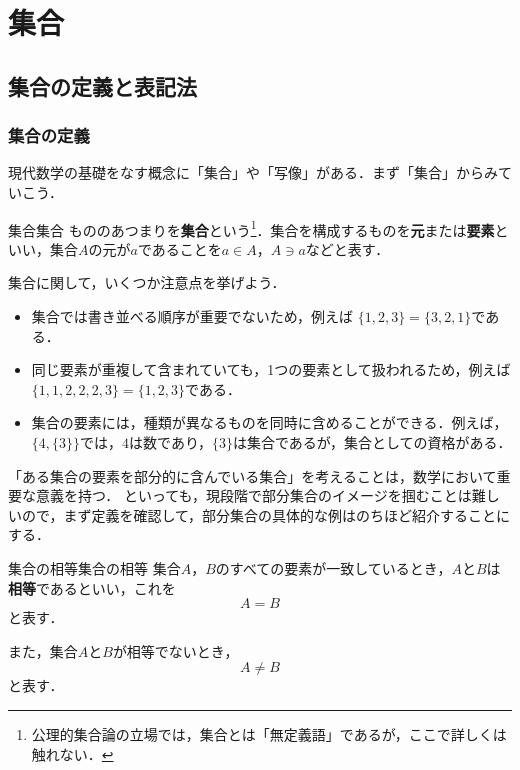 \documentclass[a4paper,11pt]{ltjsarticle}
\renewcommand{\emph}[1]{\textbf{#1}}
\begin{document}
\section{集合}
\subsection{集合の定義と表記法}

\subsubsection{集合の定義}

現代数学の基礎をなす概念に「集合」や「写像」がある．まず「集合」からみていこう．
\begin{definition}{集合}{集合}
  もののあつまりを\emph{集合}という\footnote{公理的集合論の立場では，集合とは「無定義語」であるが，ここで詳しくは触れない．}．集合を構成するものを\emph{元}または\emph{要素}といい，集合$A$の元が$a$であることを$a \in A$，$A \ni a$などと表す．
\end{definition}

集合に関して，いくつか注意点を挙げよう．

\begin{itemize}
  \item 集合では書き並べる順序が重要でないため，例えば $\{1, 2, 3\} = \{3, 2, 1\}$である．
  \item 同じ要素が重複して含まれていても，1つの要素として扱われるため，例えば$\{1, 1, 2, 2, 2, 3\} = \{1, 2, 3\}$である．
  \item 集合の要素には，種類が異なるものを同時に含めることができる．例えば，$\{4, \{3\}\}$では，$4$は数であり，$\{3\}$は集合であるが，集合としての資格がある．
\end{itemize}

「ある集合の要素を部分的に含んでいる集合」を考えることは，数学において重要な意義を持つ．
といっても，現段階で部分集合のイメージを掴むことは難しいので，まず定義を確認して，部分集合の具体的な例はのちほど紹介することにする．

\begin{definition}{集合の相等}{集合の相等}
  集合$A$，$B$のすべての要素が一致しているとき，$A$と$B$は\emph{相等}であるといい，これを
  \[
    A = B
  \]
  と表す．

  また，集合$A$と$B$が相等でないとき，
  \[
    A \ne B
  \]
  と表す．
\end{definition}
\end{document}
